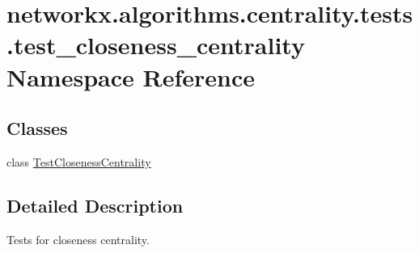 \hypertarget{namespacenetworkx_1_1algorithms_1_1centrality_1_1tests_1_1test__closeness__centrality}{}\section{networkx.\+algorithms.\+centrality.\+tests.\+test\+\_\+closeness\+\_\+centrality Namespace Reference}
\label{namespacenetworkx_1_1algorithms_1_1centrality_1_1tests_1_1test__closeness__centrality}
\subsection*{Classes}
\begin{DoxyCompactItemize}
\item 
class \hyperlink{classnetworkx_1_1algorithms_1_1centrality_1_1tests_1_1test__closeness__centrality_1_1TestClosenessCentrality}{Test\+Closeness\+Centrality}
\end{DoxyCompactItemize}


\subsection{Detailed Description}
\begin{DoxyVerb}Tests for closeness centrality.
\end{DoxyVerb}
 
